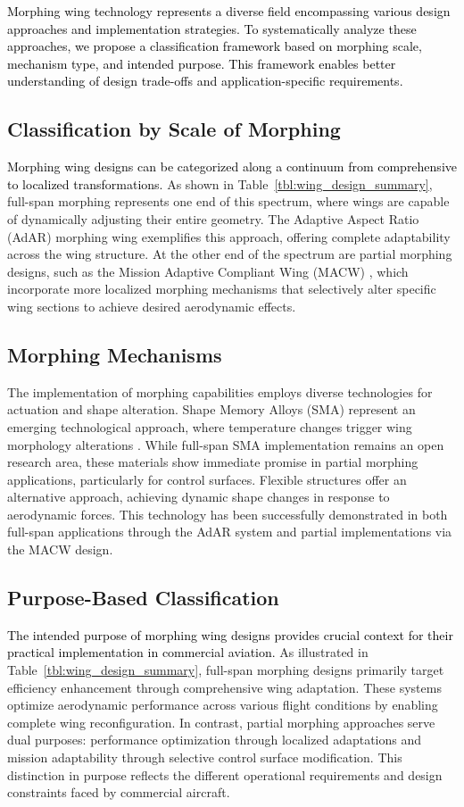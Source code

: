 \documentclass[letterpaper, journal, twoside]{IEEEtran}
\newcommand{\revision}[1]{\textcolor{black}{ #1}}
\begin{document}
\revision{Morphing wing technology represents a diverse field encompassing various design approaches and implementation strategies. To systematically analyze these approaches, we propose a classification framework based on morphing scale, mechanism type, and intended purpose. This framework enables better understanding of design trade-offs and application-specific requirements.}

\subsection{Classification by Scale of Morphing}
\revision{Morphing wing designs can be categorized along a continuum from comprehensive to localized transformations.} As shown in Table~\ref{tbl:wing_design_summary}, full-span morphing represents one end of this spectrum, where wings are capable of dynamically adjusting their entire geometry. The Adaptive Aspect Ratio (AdAR) morphing wing \cite{woods2015adaptive} exemplifies this approach, offering complete adaptability across the wing structure. At the other end of the spectrum are partial morphing designs, such as the Mission Adaptive Compliant Wing (MACW) \cite{flexsys2024flexfoil}, which incorporate more localized morphing mechanisms that selectively alter specific wing sections to achieve desired aerodynamic effects.

\subsection{Morphing Mechanisms}
The implementation of morphing capabilities employs diverse technologies for actuation and shape alteration. Shape Memory Alloys (SMA) represent an emerging technological approach, where temperature changes trigger wing morphology alterations \cite{afshohteh2023sma}. While full-span SMA implementation remains an open research area, these materials show immediate promise in partial morphing applications, particularly for control surfaces. Flexible structures offer an alternative approach, achieving dynamic shape changes in response to aerodynamic forces. This technology has been successfully demonstrated in both full-span applications through the AdAR system and partial implementations via the MACW design.

\subsection{Purpose-Based Classification}
\revision{The intended purpose of morphing wing designs provides crucial context for their practical implementation in commercial aviation.} As illustrated in Table~\ref{tbl:wing_design_summary}, full-span morphing designs primarily target efficiency enhancement through comprehensive wing adaptation. These systems optimize aerodynamic performance across various flight conditions by enabling complete wing reconfiguration. In contrast, partial morphing approaches serve dual purposes: performance optimization through localized adaptations and mission adaptability through selective control surface modification. This distinction in purpose reflects the different operational requirements and design constraints faced by commercial aircraft.
\end{document}
